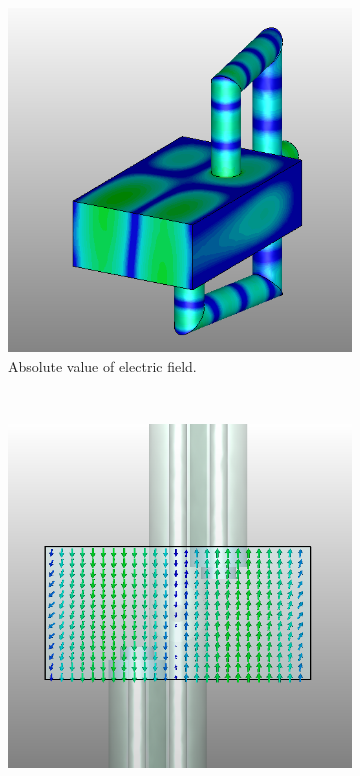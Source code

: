 \documentclass[english,twoside]{article}
\begin{document}
		\newpage
		\begin{landscape}
			\begin{figure}
				\centering
				\begin{subfigure}[b]{0.4\textwidth}
					\includegraphics[width=\textwidth]{figures/coaxToWrTE20_abs}
					\caption{Absolute value of electric field.}
				\end{subfigure}
				~
				\begin{subfigure}[b]{0.4\textwidth}
					\includegraphics[width=\textwidth]{figures/coaxToWrTE20_front}

\end{subfigure}
\end{figure}
\end{landscape}
\end{document}
